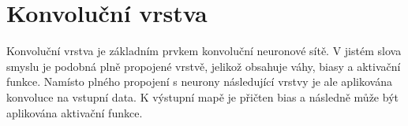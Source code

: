 






\section{Konvoluční vrstva}

Konvoluční vrstva je základním prvkem konvoluční neuronové sítě. V jistém slova
smyslu je podobná plně propojené vrstvě, jelikož obsahuje váhy, biasy a
aktivační funkce. Namísto plného propojení s neurony následující vrstvy je ale
aplikována konvoluce na vstupní data. K výstupní mapě je přičten bias a
následně může být aplikována aktivační funkce.

